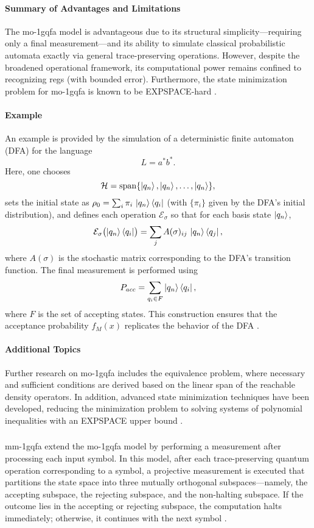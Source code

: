 \paragraph{Summary of Advantages and Limitations}  
The \gls{mo-1gqfa} model is advantageous due to its structural simplicity—requiring only a final measurement—and its ability to simulate classical probabilistic automata exactly via general trace-preserving operations. However, despite the broadened operational framework, its computational power remains confined to recognizing \glspl{reg} (with bounded error). Furthermore, the state minimization problem for \gls{mo-1gqfa} is known to be EXPSPACE-hard \cite{mateus2012complexity}.

\paragraph{Example}  
An example is provided by the simulation of a deterministic finite automaton (DFA) for the language
\[
L=a^*b^*.
\]
Here, one chooses 
\[
\mathcal{H}=\mathrm{span}\{\ket{q_n},\ket{q_n},\dots,\ket{q_n}\},
\]
sets the initial state as $\rho_0=\sum_{i}\pi_i\,\ket{q_n}\bra{q_i}$ (with $\{\pi_i\}$ given by the DFA's initial distribution), and defines each operation $\mathcal{E}_\sigma$ so that for each basis state $\ket{q_n}$,
\[
\mathcal{E}_\sigma\bigl(\ket{q_n}\bra{q_i}\bigr)=\sum_{j}A(\sigma)_{ij}\,\ket{q_n}\bra{q_j},
\]
where $A(\sigma)$ is the stochastic matrix corresponding to the DFA's transition function. The final measurement is performed using 
\[
P_{acc}=\sum_{q_i\in F}\ket{q_n}\bra{q_i},
\]
where $F$ is the set of accepting states. This construction ensures that the acceptance probability $f_M(x)$ replicates the behavior of the DFA \cite{li2012characterizations}.

\paragraph{Additional Topics}  
Further research on \gls{mo-1gqfa} includes the equivalence problem, where necessary and sufficient conditions are derived based on the linear span of the reachable density operators. In addition, advanced state minimization techniques have been developed, reducing the minimization problem to solving systems of polynomial inequalities with an EXPSPACE upper bound \cite{mercer2008lower}.

\subsubsection{}
\gls{mm-1gqfa} extend the \gls{mo-1gqfa} model by performing a measurement after processing each input symbol. In this model, after each trace-preserving quantum operation corresponding to a symbol, a projective measurement is executed that partitions the state space into three mutually orthogonal subspaces—namely, the accepting subspace, the rejecting subspace, and the non-halting subspace. If the outcome lies in the accepting or rejecting subspace, the computation halts immediately; otherwise, it continues with the next symbol \cite{li2012characterizations}.

